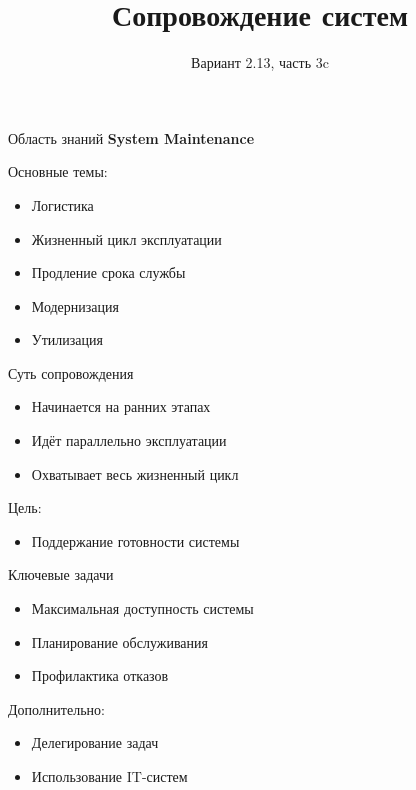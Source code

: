 \documentclass{beamer}
\title{Сопровождение систем}
\subtitle{Вариант 2.13, часть 3c}
\author{}
\date{}
\begin{document}
\frame{\titlepage}


\begin{frame}{Область знаний}
\textbf{System Maintenance}

\vspace{0.5cm}

Основные темы:
\begin{itemize}
    \item Логистика
    \item Жизненный цикл эксплуатации
    \item Продление срока службы
    \item Модернизация
    \item Утилизация
\end{itemize}

\end{frame}


\begin{frame}{Суть сопровождения}
\begin{itemize}
    \item Начинается на ранних этапах
    \item Идёт параллельно эксплуатации
    \item Охватывает весь жизненный цикл
\end{itemize}

\vspace{0.5cm}

Цель:
\begin{itemize}
    \item Поддержание готовности системы
\end{itemize}

\end{frame}


\begin{frame}{Ключевые задачи}
\begin{itemize}
    \item Максимальная доступность системы
    \item Планирование обслуживания
    \item Профилактика отказов
\end{itemize}

\vspace{0.5cm}

Дополнительно:
\begin{itemize}
    \item Делегирование задач
    \item Использование IT-систем
\end{itemize}

\end{frame}
\end{document}
